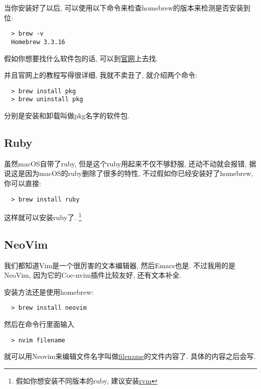 当你安装好了以后, 可以使用以下命令来检查homebrew的版本来检测是否安装到位: 

\begin{lstlisting}
  > brew -v
  Homebrew 3.3.16
\end{lstlisting}

假如你想要找什么软件包的话, 可以到\href{https://formulae.brew.sh}{官网}上去找. 

并且官网上的教程写得很详细, 我就不卖丑了, 就介绍两个命令: 

\begin{lstlisting}
  > brew install pkg
  > brew uninstall pkg
\end{lstlisting}

分别是安装和卸载叫做pkg名字的软件包. 

\subsection{Ruby}
虽然macOS自带了ruby, 但是这个ruby用起来不仅不够舒服, 还动不动就会报错, 
据说这是因为macOS的ruby删除了很多的特性, 不过假如你已经安装好了homebrew, 
你可以直接: 

\begin{lstlisting}
  > brew install ruby
\end{lstlisting}

这样就可以安装ruby了. 
\footnote{假如你想安装不同版本的ruby, 建议安装\href{http://rvm.io}{rvm}}

\subsection{NeoVim}
我们都知道Vim是一个很厉害的文本编辑器, 然后Emacs也是. 不过我用的是NeoVim, 
因为它的Coc-nvim插件比较友好, 还有文本补全. 

安装方法还是使用homebrew: 

\begin{lstlisting}
  > brew install neovim
\end{lstlisting}

然后在命令行里面输入

\begin{lstlisting}
  > nvim filename
\end{lstlisting}

就可以用Neovim来编辑文件名字叫做\underline{filename}的文件内容了. 
具体的内容之后会写. 
